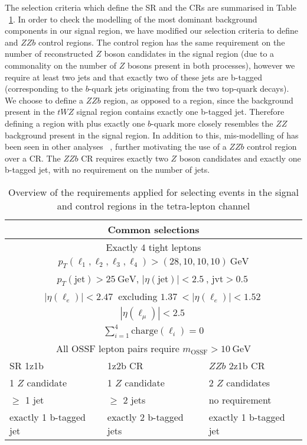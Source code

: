 The selection criteria which define the SR and the CRs are summarised in Table ~\ref{tab:4Lep-cutsummary}. In order to check the modelling of the most dominant background components in our signal region, we have modified our selection criteria to define \ttZ and $ZZb$ control regions. The \ttZ control region has the same requirement on the number of reconstructed $Z$ boson candidates in the signal region (due to a commonality on the number of $Z$ bosons present in both processes), however we require at least two jets and that exactly two of these jets are b-tagged (corresponding to the $b$-quark jets originating from the two top-quark decays). We choose to define a $ZZb$ region, as opposed to a \ZZ region, since the \ZZ background present in the $tWZ$ signal region contains exactly one b-tagged jet. Therefore defining a region with \ZZ plus exactly one $b$-quark more closely resembles the $ZZ$ background present in the signal region. In addition to this, mis-modelling of \ZZ has been seen in other analyses ~\cite{Aaboud:2019, ppToZZ:CMSpaper}, further motivating the use of a $ZZb$ control region over a \ZZ CR. The $ZZb$ CR requires exactly two $Z$ boson candidates and exactly one b-tagged jet, with no requirement on the number of jets.




\begin{table}[htbp]
	
	
	\centering
	\begin{tabular}{m{3.5cm}m{3.5cm}m{3.5cm}}
		\toprule
		\multicolumn{3}{c}{Common selections}  \\
		\midrule
		\multicolumn{3}{c}{Exactly 4 tight leptons}   \\
		\multicolumn{3}{c}{$p_T(\ell_1,\ell_2,\ell_3,\ell_4) > (28,10,10,10) \SI{}{\GeV}$}   \\
		\multicolumn{3}{c}{$p_T(\text{jet})> \SI{25}{\GeV}$, $|\eta(\text{jet})| < \SI{2.5}{}$, $\text{jvt} > \SI{0.5}{}$}   \\
		\multicolumn{3}{c}{$|\eta(\ell_e)| < \SI{2.47}{}$ excluding $\SI{1.37}{} < |\eta(\ell_e)| < \SI{1.52}{}$}   \\
		\multicolumn{3}{c}{$|\eta(\ell_\mu)| < \SI{2.5}{}$}   \\
		\multicolumn{3}{c}{$\displaystyle\sum_{i=1}^{4} \text{charge}(\ell_i) = 0$}   \\
		\multicolumn{3}{c}{All OSSF lepton pairs require $m_{\text{OSSF}} > \SI{10}{\GeV}$}   \\
		\bottomrule
		SR 1z1b & \ttZ 1z2b CR & $ZZb$ 2z1b CR\\
		\midrule
		1 $Z$ candidate & 1 $Z$ candidate & 2 $Z$ candidates\\
		$\geq$ 1 jet & $\geq$ 2 jets & no requirement\\
		exactly 1 b-tagged jet & exactly 2 b-tagged jets & exactly 1 b-tagged jet\\
		\bottomrule
	\end{tabular}
	\caption{
		Overview of the requirements applied for selecting events in the signal and control regions in the tetra-lepton channel
	}%
	\label{tab:4Lep-cutsummary}
\end{table}


